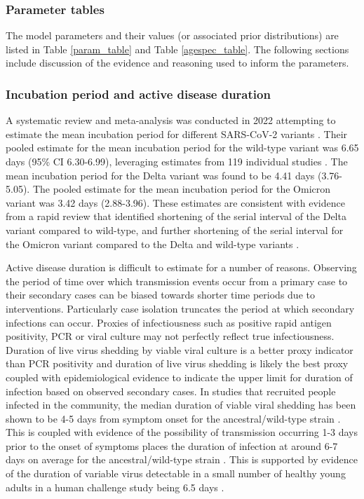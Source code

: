 \subsubsection{Parameter tables}
The model parameters and their values (or associated prior distributions) are listed in Table \ref{param_table} and Table \ref{agespec_table}. The
following sections include discussion of the evidence and reasoning used to inform the parameters.

\renewcommand{\arraystretch}{1.3}
 

\renewcommand{\arraystretch}{1.3}
 


\subsubsection{Incubation period and active disease duration}
A systematic review and meta-analysis was conducted in 2022 attempting to estimate the mean incubation period for 
different SARS-CoV-2 variants \cite{wu2022}. Their pooled estimate for the mean incubation period for the wild-type 
variant was 6.65 days (95\% CI 6.30-6.99), leveraging estimates from 119 individual studies \cite{wu2022}.
The mean incubation period for the Delta variant was found to be 4.41 days (3.76-5.05). 
The pooled estimate for the mean incubation period for the Omicron variant was 3.42 days (2.88-3.96). 
These estimates are consistent with evidence from a rapid review that identified shortening of the serial interval of the 
Delta variant compared to wild-type, and further shortening of the serial interval for the Omicron variant compared to the 
Delta and wild-type variants \cite{madewell2023}.

Active disease duration is difficult to estimate for a number of reasons. Observing the period of time over which transmission events
occur from a primary case to their secondary cases can be biased towards shorter time periods due to interventions. Particularly 
case isolation truncates the period at which secondary infections can occur. Proxies of infectiousness such as positive rapid 
antigen positivity, PCR or viral culture may not perfectly reflect true infectiousness. Duration of live virus shedding by viable 
viral culture is a better proxy indicator than PCR positivity and duration of live virus shedding is likely the best proxy coupled 
with epidemiological evidence to indicate the upper limit for duration of infection based on observed secondary cases.
In studies that recruited people infected in the community, the median duration of viable viral shedding has been shown to be 
4-5 days from symptom onset for the ancestral/wild-type strain \cite{singanayagam2020, hakki2022}. This is coupled with evidence of 
the possibility of transmission occurring 1-3 days prior to the onset of symptoms places the duration of infection at around 6-7 days 
on average for the ancestral/wild-type strain \cite{he2020}. This is supported by evidence of the duration of variable virus 
detectable in a small number of healthy young adults in a human challenge study being 6.5 days \cite{killingley2022}.


